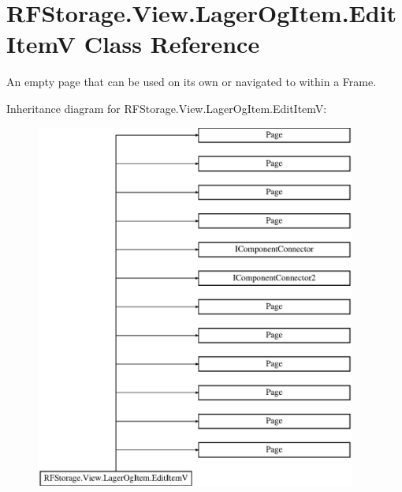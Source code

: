 \hypertarget{class_r_f_storage_1_1_view_1_1_lager_og_item_1_1_edit_item_v}{}\section{R\+F\+Storage.\+View.\+Lager\+Og\+Item.\+Edit\+ItemV Class Reference}
\label{class_r_f_storage_1_1_view_1_1_lager_og_item_1_1_edit_item_v}


An empty page that can be used on its own or navigated to within a Frame.  


Inheritance diagram for R\+F\+Storage.\+View.\+Lager\+Og\+Item.\+Edit\+ItemV\+:\begin{figure}[H]
\begin{center}
\leavevmode
\includegraphics[height=12.000000cm]{class_r_f_storage_1_1_view_1_1_lager_og_item_1_1_edit_item_v}
\end{center}
\end{figure}
